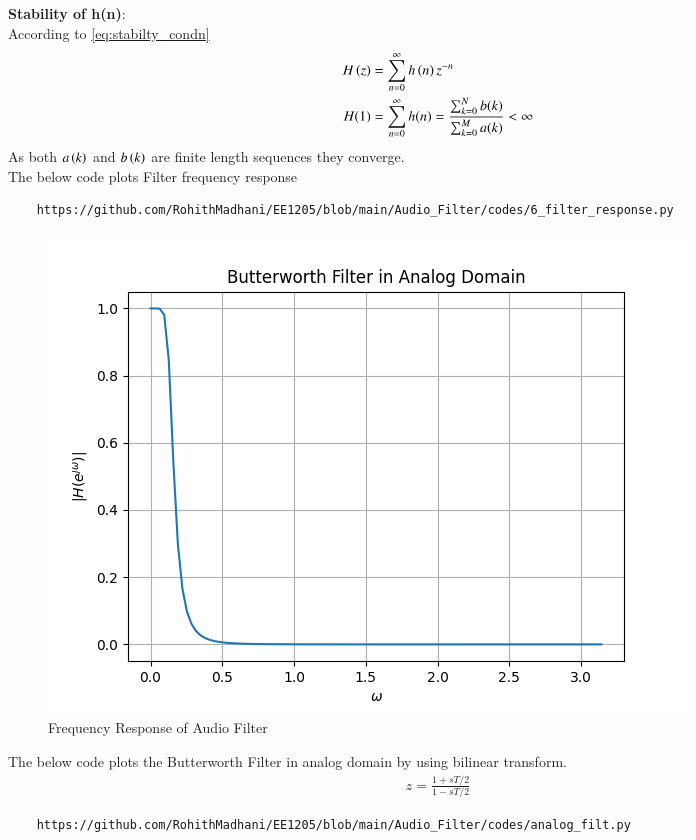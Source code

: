 \documentclass[journal,12pt,twocolumn]{IEEEtran}
\theoremstyle{remark}
\begin{document}
\begin{enumerate}[label=\thesection.\arabic*]
\textbf{Stability of h(n)}:\\
According to \eqref{eq:stabilty_condn}
\begin{align}
H\left(z\right) &= \sum_{n = 0}^{\infty} h\left(n\right)z^{-n}\\
H(1)&= \sum_{n = 0}^{\infty}h(n)  = \frac{\sum_{k = 0}^{N}b(k)}{\sum_{k = 0}^{M}a(k)}< \infty
\end{align}
As both $a\left(k\right)$ and $b\left(k\right)$ are finite length sequences they converge.\\
The below code plots Filter frequency response
\begin{lstlisting}
    https://github.com/RohithMadhani/EE1205/blob/main/Audio_Filter/codes/6_filter_response.py
\end{lstlisting}
\begin{figure}[H]
\centering
\includegraphics[width=1\columnwidth]{figs/Filter_Response.png}
\caption{Frequency Response of Audio Filter}
\label{fig:H(w)_6}
\end{figure}
The below code plots the Butterworth Filter in analog domain by using bilinear transform.
\begin{align}
    z=\frac{1+sT/2}{1-sT/2}
\end{align}
\begin{lstlisting}
    https://github.com/RohithMadhani/EE1205/blob/main/Audio_Filter/codes/analog_filt.py
\end{lstlisting}
\begin{figure}[H]
\centering

\end{figure}
\end{enumerate}
\end{document}
